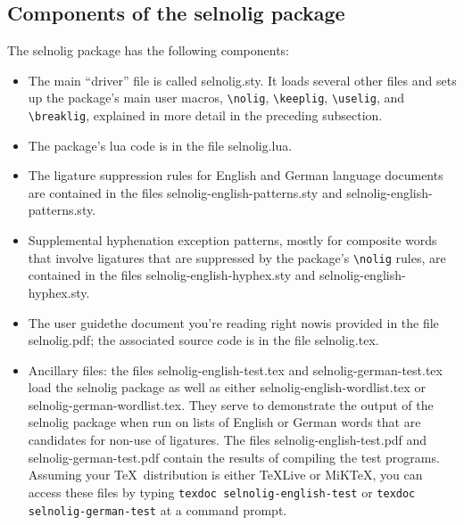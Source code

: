 \documentclass[11pt]{article}
\newcommand{\pkg}[1]{\textsf{#1}}
\newcommand{\cmmd}[1]{\texttt{\textbackslash #1}}
\begin{document}
\subsection[Components of the selnolig package]{Components of the \pkg{selnolig} package}

The \pkg{selnolig} package has the following components:
\begin{itemize}
\item The main \enquote{driver} file is called \pkg{selnolig.sty}. It loads several other files and sets up the package's main user macros, \cmmd{nolig}, \cmmd{keeplig}, \cmmd{uselig}, and \cmmd{breaklig},  explained in more detail in the preceding subsection.
\item The package's lua code is in the file \pkg{selnolig.lua}. 
\item The ligature suppression rules for English and German language documents are contained in the files \pkg{selnolig-english-patterns.sty} and \pkg{selnolig-english-patterns.sty}. 
\item Supplemental hyphenation exception patterns, mostly for composite words that involve ligatures that are  suppressed by the package's \cmmd{nolig} rules, are contained in the files \pkg{selnolig-english-hyphex.sty} and \pkg{selnolig-english-hyphex.sty}.
\item The user guide\textemdash the document you're reading right now\textemdash is provided in the file \pkg{selnolig.pdf}; the associated source code is in the file \pkg{selnolig.tex}. 
\item Ancillary files: the files \pkg{selnolig-english-test.tex} and \pkg{selnolig-german-test.tex} load the \pkg{selnolig} package as well as either \pkg{selnolig-english-wordlist.tex} or \pkg{selnolig-german-wordlist.tex}. They serve to demonstrate the output of the \pkg{selnolig} package when run on lists of English or German words that are candidates for non-use of ligatures. The files \pkg{selnolig-english-test.pdf} and \pkg{selnolig-german-test.pdf} contain the results of compiling the test programs. 
Assuming your \TeX\ distribution is either \TeX Live or MiK\TeX, you can access these files by typing \Verb+texdoc selnolig-english-test+ or \Verb+texdoc selnolig-german-test+ at a command prompt. 
\end{itemize}
\end{document}
